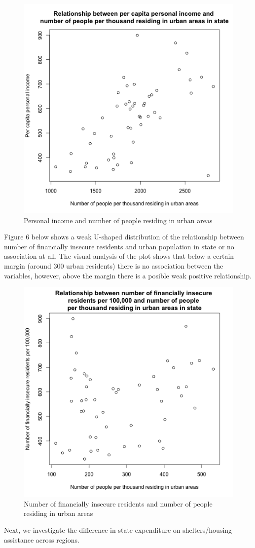 \documentclass[12pt,letterpaper]{article}
\begin{document}
\begin{figure}[h!]\centering
	\caption{\footnotesize Personal income and number of people residing in urban areas}
	\label{fig:plot_5}
	\includegraphics[width=.5\textwidth]{scatterplot_x1_x3.png}
\end{figure}

\noindent Figure 6 below shows a weak U-shaped distribution of the relationship between number of financially insecure residents and urban population in state or no association at all. The visual analysis of the plot shows that below a certain margin (around 300 urban residents) there is no association between the variables, however, above the margin there is a posible weak positive relationship.\\
\pagebreak

\begin{figure}[h!]\centering
	\caption{\footnotesize Number of financially insecure residents and number of people residing in urban areas}
	\label{fig:plot_6}
	\includegraphics[width=.5\textwidth]{scatterplot_x2_x3.png}
\end{figure}

\noindent Next, we investigate the difference in state expenditure on shelters/housing assistance across regions. \\
\end{document}
